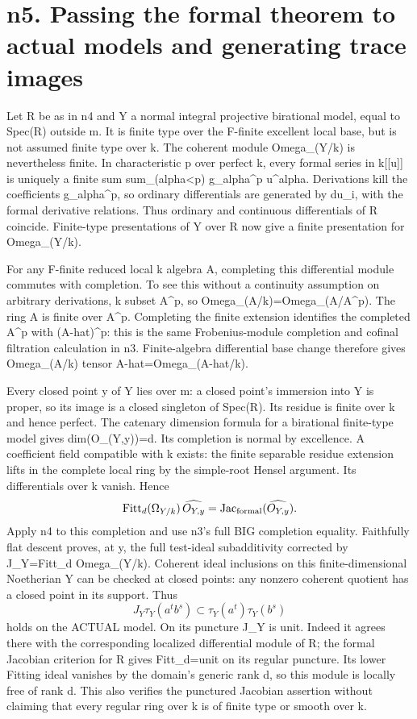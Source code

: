 \documentclass[11pt]{article}
\begin{document}
\section{n5. Passing the formal theorem to actual models and generating trace images}

Let R be as in n4 and Y a normal integral projective birational model, equal to Spec(R) outside m. It is finite type over the F-finite excellent local base, but is not assumed finite type over k. The coherent module Omega\_(Y/k) is nevertheless finite. In characteristic p over perfect k, every formal series in k[[u]] is uniquely a finite sum sum\_(alpha<p) g\_alpha\textasciicircum{}p u\textasciicircum{}alpha. Derivations kill the coefficients g\_alpha\textasciicircum{}p, so ordinary differentials are generated by du\_i, with the formal derivative relations. Thus ordinary and continuous differentials of R coincide. Finite-type presentations of Y over R now give a finite presentation for Omega\_(Y/k).

For any F-finite reduced local k algebra A, completing this differential module commutes with completion. To see this without a continuity assumption on arbitrary derivations, k subset A\textasciicircum{}p, so Omega\_(A/k)=Omega\_(A/A\textasciicircum{}p). The ring A is finite over A\textasciicircum{}p. Completing the finite extension identifies the completed A\textasciicircum{}p with (A-hat)\textasciicircum{}p: this is the same Frobenius-module completion and cofinal filtration calculation in n3. Finite-algebra differential base change therefore gives Omega\_(A/k) tensor A-hat=Omega\_(A-hat/k).

Every closed point y of Y lies over m: a closed point's immersion into Y is proper, so its image is a closed singleton of Spec(R). Its residue is finite over k and hence perfect. The catenary dimension formula for a birational finite-type model gives dim(O\_(Y,y))=d. Its completion is normal by excellence. A coefficient field compatible with k exists: the finite separable residue extension lifts in the complete local ring by the simple-root Hensel argument. Its differentials over k vanish. Hence
\[
\operatorname{Fitt}_d(\Omega_{Y/k})\,\widehat{O_{Y,y}}
=\operatorname{Jac}_{\rm formal}(\widehat{O_{Y,y}}).
\]
Apply n4 to this completion and use n3's full BIG completion equality. Faithfully flat descent proves, at y, the full test-ideal subadditivity corrected by J\_Y=Fitt\_d Omega\_(Y/k). Coherent ideal inclusions on this finite-dimensional Noetherian Y can be checked at closed points: any nonzero coherent quotient has a closed point in its support. Thus
\[
J_Y\tau_Y(a^t b^s)\subset\tau_Y(a^t)\tau_Y(b^s)
\]
holds on the ACTUAL model. On its puncture J\_Y is unit. Indeed it agrees there with the corresponding localized differential module of R; the formal Jacobian criterion for R gives Fitt\_d=unit on its regular puncture. Its lower Fitting ideal vanishes by the domain's generic rank d, so this module is locally free of rank d. This also verifies the punctured Jacobian assertion without claiming that every regular ring over k is of finite type or smooth over k.
\end{document}
